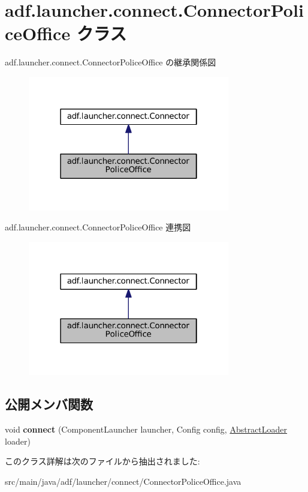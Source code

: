 \hypertarget{classadf_1_1launcher_1_1connect_1_1ConnectorPoliceOffice}{}\section{adf.\+launcher.\+connect.\+Connector\+Police\+Office クラス}
\label{classadf_1_1launcher_1_1connect_1_1ConnectorPoliceOffice}


adf.\+launcher.\+connect.\+Connector\+Police\+Office の継承関係図
\nopagebreak
\begin{figure}[H]
\begin{center}
\leavevmode
\includegraphics[width=250pt]{classadf_1_1launcher_1_1connect_1_1ConnectorPoliceOffice__inherit__graph}
\end{center}
\end{figure}


adf.\+launcher.\+connect.\+Connector\+Police\+Office 連携図
\nopagebreak
\begin{figure}[H]
\begin{center}
\leavevmode
\includegraphics[width=250pt]{classadf_1_1launcher_1_1connect_1_1ConnectorPoliceOffice__coll__graph}
\end{center}
\end{figure}
\subsection*{公開メンバ関数}
\begin{DoxyCompactItemize}
\item 
\hypertarget{classadf_1_1launcher_1_1connect_1_1ConnectorPoliceOffice_a3f3c777ef185ec0b4e47678a2213310b}{}\label{classadf_1_1launcher_1_1connect_1_1ConnectorPoliceOffice_a3f3c777ef185ec0b4e47678a2213310b} 
void {\bfseries connect} (Component\+Launcher launcher, Config config, \hyperlink{classadf_1_1component_1_1AbstractLoader}{Abstract\+Loader} loader)
\end{DoxyCompactItemize}


このクラス詳解は次のファイルから抽出されました\+:\begin{DoxyCompactItemize}
\item 
src/main/java/adf/launcher/connect/Connector\+Police\+Office.\+java\end{DoxyCompactItemize}
